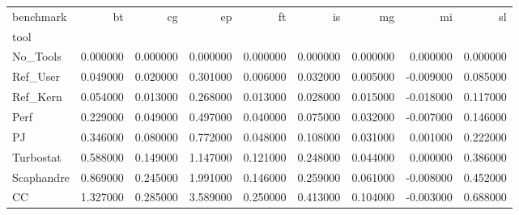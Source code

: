 \begin{tabular}{lrrrrrrrr}
\toprule
benchmark & bt & cg & ep & ft & is & mg & mi & sl \\
tool &  &  &  &  &  &  &  &  \\
\midrule
No_Tools & 0.000000 & 0.000000 & 0.000000 & 0.000000 & 0.000000 & 0.000000 & 0.000000 & 0.000000 \\
Ref_User & 0.049000 & 0.020000 & 0.301000 & 0.006000 & 0.032000 & 0.005000 & -0.009000 & 0.085000 \\
Ref_Kern & 0.054000 & 0.013000 & 0.268000 & 0.013000 & 0.028000 & 0.015000 & -0.018000 & 0.117000 \\
Perf & 0.229000 & 0.049000 & 0.497000 & 0.040000 & 0.075000 & 0.032000 & -0.007000 & 0.146000 \\
PJ & 0.346000 & 0.080000 & 0.772000 & 0.048000 & 0.108000 & 0.031000 & 0.001000 & 0.222000 \\
Turbostat & 0.588000 & 0.149000 & 1.147000 & 0.121000 & 0.248000 & 0.044000 & 0.000000 & 0.386000 \\
Scaphandre & 0.869000 & 0.245000 & 1.991000 & 0.146000 & 0.259000 & 0.061000 & -0.008000 & 0.452000 \\
CC & 1.327000 & 0.285000 & 3.589000 & 0.250000 & 0.413000 & 0.104000 & -0.003000 & 0.688000 \\
\bottomrule
\end{tabular}
